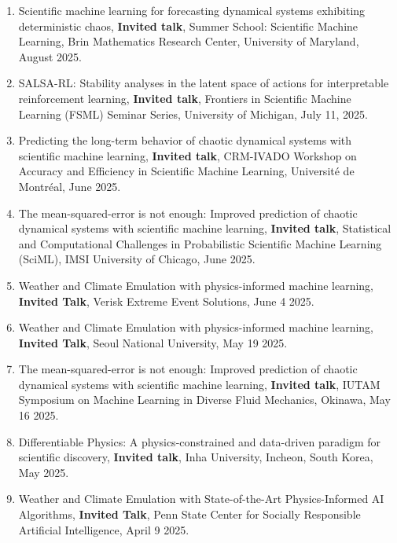 \documentclass[letterpaper]{article}
\begin{document}
\begin{enumerate}
\item Scientific machine learning for forecasting dynamical systems exhibiting deterministic chaos, \textbf{Invited talk}, Summer School: Scientific Machine Learning, Brin Mathematics Research Center, University of Maryland, August 2025.

\item SALSA-RL: Stability analyses in the latent space of actions for interpretable reinforcement learning, \textbf{Invited talk}, Frontiers in Scientific Machine Learning (FSML) Seminar Series, University of Michigan, July 11, 2025.

\item Predicting the long-term behavior of chaotic dynamical systems with scientific machine learning, \textbf{Invited talk}, CRM-IVADO Workshop on Accuracy and Efficiency in Scientific Machine Learning, Universit\'{e} de Montr\'{e}al, June 2025. 

\item The mean-squared-error is not enough: Improved prediction of chaotic dynamical systems with scientific machine learning, \textbf{Invited talk}, Statistical and Computational Challenges in Probabilistic Scientific Machine Learning (SciML), IMSI University of Chicago, June 2025.

\item Weather and Climate Emulation with physics-informed machine learning, \textbf{Invited Talk}, Verisk Extreme Event Solutions, June 4 2025.

\item Weather and Climate Emulation with physics-informed machine learning, \textbf{Invited Talk}, Seoul National University, May 19 2025.

\item The mean-squared-error is not enough: Improved prediction of chaotic dynamical systems with scientific machine learning, \textbf{Invited talk}, IUTAM Symposium on Machine Learning in Diverse Fluid Mechanics, Okinawa, May 16 2025.

\item Differentiable Physics: A physics-constrained and data-driven paradigm for scientific discovery, \textbf{Invited talk}, Inha University, Incheon, South Korea, May 2025.

\item Weather and Climate Emulation with State-of-the-Art Physics-Informed AI Algorithms, \textbf{Invited Talk}, Penn State Center for Socially Responsible Artificial Intelligence, April 9 2025.


\end{enumerate}
\end{document}
